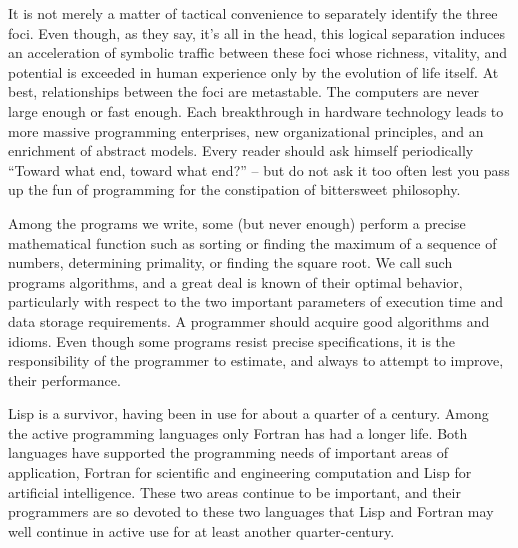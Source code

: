 It is not merely a matter of tactical convenience to separately
identify the three foci.  Even though, as they say, it's all in the
head, this logical separation induces an acceleration of symbolic
traffic between these foci whose richness, vitality, and potential is
exceeded in human experience only by the evolution of life itself.  At
best, relationships between the foci are metastable.  The computers
are never large enough or fast enough.  Each breakthrough in hardware
technology leads to more massive programming enterprises, new
organizational principles, and an enrichment of abstract models.
Every reader should ask himself periodically ``Toward what end, toward
what end?'' -- but do not ask it too often lest you pass up the fun of
programming for the constipation of bittersweet philosophy.

Among the programs we write, some (but never enough) perform a precise
mathematical function such as sorting or finding the maximum of a
sequence of numbers, determining primality, or finding the square
root.  We call such programs algorithms, and a great deal is known of
their optimal behavior, particularly with respect to the two important
parameters of execution time and data storage requirements.  A
programmer should acquire good algorithms and idioms.  Even though
some programs resist precise specifications, it is the responsibility
of the programmer to estimate, and always to attempt to improve, their
performance.

Lisp is a survivor, having been in use for about a quarter of a
century.  Among the active programming languages only Fortran has had
a longer life.  Both languages have supported the programming needs of
important areas of application, Fortran for scientific and engineering
computation and Lisp for artificial intelligence.  These two areas
continue to be important, and their programmers are so devoted to
these two languages that Lisp and Fortran may well continue in active
use for at least another quarter-century.

